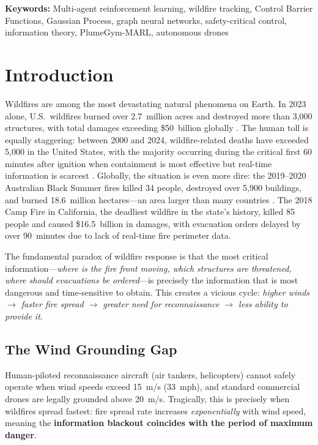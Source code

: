 \documentclass[12pt,a4paper]{article}
\begin{document}
\noindent\textbf{Keywords:} Multi-agent reinforcement learning, wildfire tracking, Control Barrier Functions, Gaussian Process, graph neural networks, safety-critical control, information theory, PlumeGym-MARL, autonomous drones

\newpage
\tableofcontents
\newpage

\section{Introduction}
\label{sec:intro}

Wildfires are among the most devastating natural phenomena on Earth. In 2023 alone, U.S.\ wildfires burned over 2.7~million acres and destroyed more than 3,000 structures, with total damages exceeding \$50~billion globally \cite{NOAA2023}. The human toll is equally staggering: between 2000 and 2024, wildfire-related deaths have exceeded 5,000 in the United States, with the majority occurring during the critical first 60 minutes after ignition when containment is most effective but real-time information is scarcest \cite{NOAAHurricane2020}. Globally, the situation is even more dire: the 2019--2020 Australian Black Summer fires killed 34 people, destroyed over 5,900 buildings, and burned 18.6~million hectares---an area larger than many countries \cite{FEMA2019}. The 2018 Camp Fire in California, the deadliest wildfire in the state's history, killed 85 people and caused \$16.5~billion in damages, with evacuation orders delayed by over 90~minutes due to lack of real-time fire perimeter data.

The fundamental paradox of wildfire response is that the most critical information---\emph{where is the fire front moving, which structures are threatened, where should evacuations be ordered}---is precisely the information that is most dangerous and time-sensitive to obtain. This creates a vicious cycle: \emph{higher winds $\to$ faster fire spread $\to$ greater need for reconnaissance $\to$ less ability to provide it}.

\subsection{The Wind Grounding Gap}
\label{sec:wind_gap}

Human-piloted reconnaissance aircraft (air tankers, helicopters) cannot safely operate when wind speeds exceed 15~m/s (33~mph), and standard commercial drones are legally grounded above 20~m/s. Tragically, this is precisely when wildfires spread fastest: fire spread rate increases \emph{exponentially} with wind speed, meaning the \textbf{information blackout coincides with the period of maximum danger}.
\end{document}
